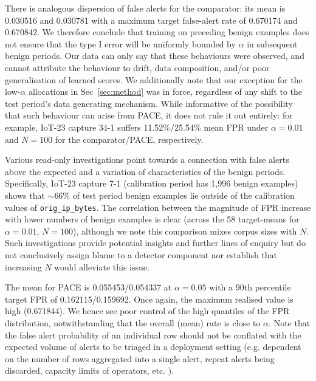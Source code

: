 \begin{table}[!htbp] 
\centering\small 
\caption{Realised per-target PACE false alert rates over benign test data, mean-over-learning-seeds. Values in the rightmost columns are the proportion of targets whose FPR exceeds the respective multiple of $\alpha$.}
\label{tab:fpr} 
 
\end{table} 

There is analogous dispersion of false alerts for the comparator: its mean is 0.030516 and 0.030781 with a maximum target false-alert rate of 0.670174 and 0.670842. We therefore conclude that training on preceding benign examples does not ensure that the type I error will be uniformly bounded by $\alpha$ in subsequent benign periods. Our data can only say that these behaviours were observed, and cannot attribute the behaviour to drift, data composition, and/or poor generalisation of learned scores. We additionally note that our exception for the low-$\alpha$ allocations in Sec~\ref{sec:method} was in force, regardless of any shift to the test period's data generating mechanism. While informative of the possibility that such behaviour can arise from PACE, it does not rule it out entirely: for example, IoT-23 capture 34-1 suffers 11.52\%/25.54\% mean FPR under $\alpha=0.01$ and $N=100$ for the comparator/PACE, respectively.

Various read-only investigations point towards a connection with false alerts above the expected and a variation of characteristics of the benign periods. Specifically, IoT-23 capture 7-1 (calibration period has 1,996 benign examples) shows that $\sim$66\% of test period benign examples lie outside of the calibration values of \texttt{orig\_ip\_bytes}. The correlation between the magnitude of FPR increase with lower numbers of benign examples is clear (across the 58 target-means for $\alpha = 0.01$, $N=100$), although we note this comparison mixes corpus sizes with $N$. Such investigations provide potential insights and further lines of enquiry but do not conclusively assign blame to a detector component nor establish that increasing $N$ would alleviate this issue.

The mean for PACE is 0.055453/0.054337 at $\alpha=0.05$ with a 90th percentile target FPR of 0.162115/0.159692. Once again, the maximum realised value is high (0.671844). We hence see poor control of the high quantiles of the FPR distribution, notwithstanding that the overall (mean) rate is close to $\alpha$. Note that the false alert probability of an individual row should not be conflated with the expected volume of alerts to be triaged in a deployment setting (e.g. dependent on the number of rows aggregated into a single alert, repeat alerts being discarded, capacity limits of operators, etc. ).

